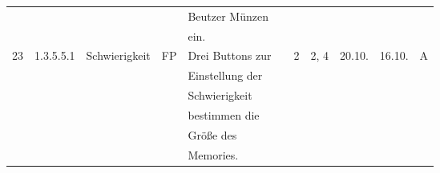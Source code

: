 \begin{longtable}{|c|l|l|c|l|l|c|c|c|c|c|}
            &       &            &    & Beutzer Münzen &   &   & & & &\\
            &       &            &    & ein. &   &   & & & &\\
            \hline
            23 & 1.3.5.5.1 & Schwierigkeit & FP & Drei Buttons zur &  & 2 & 2, 4 & 20.10. & 16.10. & A \\
            &       &            &    & Einstellung der &   &   & & & &\\
            &       &            &    & Schwierigkeit &   &   & & & &\\
            &       &            &    & bestimmen die &   &   & & & &\\
            &       &            &    & Größe des &   &   & & & &\\
            &       &            &    & Memories. &   &   & & & &\\
            \hline
            
    \end{longtable}  
    

